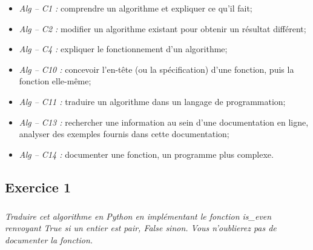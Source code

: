 \documentclass[10pt]{article}
\newif\ifxp
\begin{document}
\ifxp

\else

\fi

\begin{comp}
\begin{itemize}
\item \textit{Alg -- C1 :} comprendre un algorithme et expliquer ce qu’il fait;
\item \textit{Alg -- C2 :} modifier un algorithme existant pour obtenir un résultat différent;
\item \textit{Alg -- C4 :} expliquer le fonctionnement d’un algorithme;
\item \textit{Alg -- C10 :} concevoir l’en-tête (ou la spécification) d’une fonction, puis la fonction elle-même;
\item \textit{Alg -- C11 :} traduire un algorithme dans un langage de programmation;
\item \textit{Alg -- C13 :} rechercher une information au sein d’une documentation en ligne, analyser des exemples fournis dans cette documentation;
\item \textit{Alg -- C14 :} documenter une fonction, un programme plus complexe.
\end{itemize}
\end{comp}

\subsection*{Exercice 1}
\setcounter{subparagraph}{0}

\subparagraph{}\textit{Traduire cet algorithme en Python en implémentant le fonction \textsf{is\_even} renvoyant \textsf{True} si un entier est pair, \textsf{False} sinon. Vous n'oublierez pas de documenter la fonction.}
\end{document}
